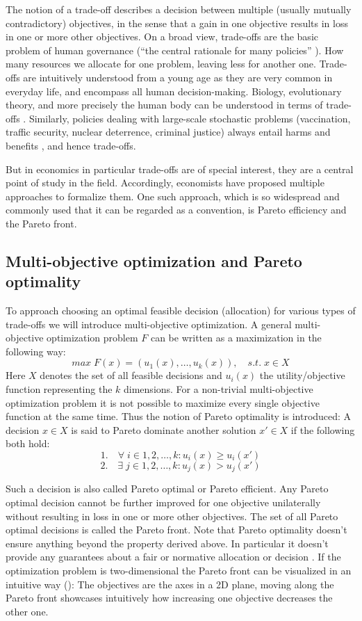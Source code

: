 	The notion of a trade-off describes a decision between multiple (usually mutually contradictory) objectives, in the sense that a gain in one objective results in loss in one or more other objectives.
	On a broad view, trade-offs are the basic problem of human governance (``the central rationale for many policies'' \cite[p.~77]{Hardin1989}).
    How many resources we allocate for one problem, leaving less for another one.
	Trade-offs are intuitively understood from a young age as they are very common in everyday life, and encompass all human decision-making.
	Biology, evolutionary theory, and more precisely the human body can be understood in terms of trade-offs \cite{Launer2020}.
	Similarly, policies dealing with large-scale stochastic problems (vaccination, traffic security, nuclear deterrence, criminal justice) always entail harms and benefits \cite{Hardin1989}, and hence trade-offs.

	But in economics in particular trade-offs are of special interest, they are a central point of study in the field.
	Accordingly, economists have proposed multiple approaches to formalize them.
	One such approach, which is so widespread and commonly used that it can be regarded as a convention, is Pareto efficiency and the Pareto front.

	\subsection{Multi-objective optimization and Pareto optimality}

	To approach choosing an optimal feasible decision (allocation) for various types of trade-offs we will introduce multi-objective optimization.
	A general multi-objective optimization problem $F$ can be written as a maximization in the following way:
	$$max \; F(x)=(u_1(x),\dots,u_k(x)), \quad s.t.\; x\in X$$
	Here $X$ denotes the set of all feasible decisions and $u_i(x)$ the utility/objective function representing the $k$ dimensions.
	For a non-trivial multi-objective optimization problem it is not possible to maximize every single objective function at the same time.
	Thus the notion of Pareto optimality is introduced:
	A decision $x\in X$ is said to Pareto dominate another solution $x'\in X$ if the following both hold:
	$$1.\quad \forall\; i\in {1,2,\dots,k}: u_i(x)\ge u_i(x')$$
	$$2.\quad \exists\; j\in {1,2,\dots,k}: u_j(x) > u_j(x')$$

	Such a decision is also called Pareto optimal or Pareto efficient.
	Any Pareto optimal decision cannot be further improved for one objective unilaterally without resulting in loss in one or more other objectives.
	The set of all Pareto optimal decisions is called the Pareto front.
	Note that Pareto optimality doesn't ensure anything beyond the property derived above.
	In particular it doesn't provide any guarantees about a fair or normative allocation or decision \cite{van2007ethics}.
	If the optimization problem is two-dimensional the Pareto front can be visualized in an intuitive way ():
	The objectives are the axes in a 2D plane, moving along the Pareto front showcases intuitively how increasing one objective decreases the other one.


